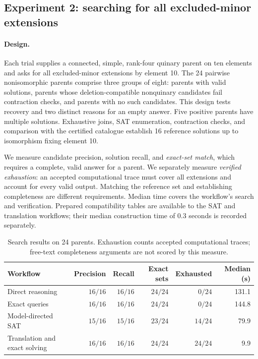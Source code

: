 \documentclass[11pt,letterpaper,titlepage]{article}
\begin{document}
\subsection{Experiment 2: searching for all excluded-minor extensions}
\label{sec:search}

\paragraph{Design.}
Each trial supplies a connected, simple, rank-four quinary parent on ten elements and asks for all excluded-minor extensions by element 10. The 24 pairwise nonisomorphic parents comprise three groups of eight: parents with valid solutions, parents whose deletion-compatible nonquinary candidates fail contraction checks, and parents with no such candidates. This design tests recovery and two distinct reasons for an empty answer. Five positive parents have multiple solutions. Exhaustive joins, SAT enumeration, contraction checks, and comparison with the certified catalogue establish 16 reference solutions up to isomorphism fixing element 10.

We measure candidate precision, solution recall, and \emph{exact-set match}, which requires a complete, valid answer for a parent. We separately measure \emph{verified exhaustion}: an accepted computational trace must cover all extensions and account for every valid output. Matching the reference set and establishing completeness are different requirements. Median time covers the workflow's search and verification. Prepared compatibility tables are available to the SAT and translation workflows; their median construction time of 0.3 seconds is recorded separately.

\begin{table}[!htbp]
\centering
\caption{Search results on 24 parents. Exhaustion counts accepted computational traces; free-text completeness arguments are not scored by this measure.}
\label{tab:search-main}
\begin{tabular}{@{}lrrrrr@{}}
\toprule
Workflow & Precision & Recall & Exact sets & Exhausted & Median (s) \\
\midrule
Direct reasoning & \(16/16\) & \(16/16\) & \(24/24\) & \(0/24\) & 131.1 \\
Exact queries & \(16/16\) & \(16/16\) & \(24/24\) & \(0/24\) & 144.8 \\
Model-directed SAT & \(15/16\) & \(15/16\) & \(23/24\) & \(14/24\) & 79.9 \\
Translation and exact solving & \(16/16\) & \(16/16\) & \(24/24\) & \(24/24\) & 9.9 \\
\bottomrule
\end{tabular}
\end{table}
\end{document}
